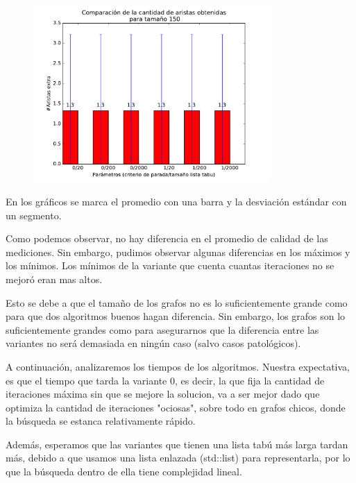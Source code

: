 \begin{figure}[H]
 \centering
	\includegraphics[width=0.8\textwidth]{graficos/problema_6/calidad2.pdf}
	\caption{}
	\label{fig:problema6-calidad2}
\end{figure}

En los gráficos se marca el promedio con una barra y la desviación estándar con un segmento.

Como podemos observar, no hay diferencia en el promedio de calidad de las mediciones.
Sin embargo, pudimos observar algunas diferencias en los máximos y los mínimos. Los mínimos de la variante que cuenta cuantas iteraciones no se mejoró eran mas altos.

Esto se debe a que el tamaño de los grafos no es lo suficientemente grande como para que dos algoritmos buenos hagan diferencia. Sin embargo, los grafos son lo suficientemente grandes como para asegurarnos que la diferencia entre las variantes no será demasiada en ningún caso (salvo casos patológicos).


A continuación, analizaremos los tiempos de los algoritmos. Nuestra expectativa, es que el tiempo que tarda la variante 0, es decir, la que fija la cantidad de iteraciones máxima sin que se mejore la solucion, va a ser mejor dado que optimiza la cantidad de iteraciones "ociosas", sobre todo en grafos chicos, donde la búsqueda se estanca relativamente rápido.

Además, esperamos que las variantes que tienen una lista tabú más larga tardan más, debido a que usamos una lista enlazada (std::list) para representarla, por lo que la búsqueda dentro de ella tiene complejidad lineal.

